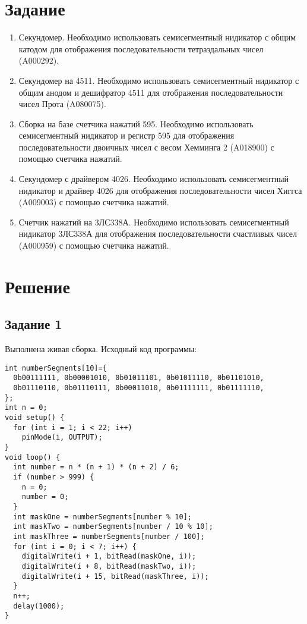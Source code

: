 \documentclass[a4paper,14pt]{extarticle}
\begin{document}
  \section*{\hspace{12.5mm}Задание}
  \begin{enumerate}
    \item Секундомер. Необходимо использовать семисегментный нидикатор с общим катодом для отображения последовательности тетраэдальных чисел (A000292).
    \item Секундомер на 4511. Необходимо использовать семисегментный нидикатор с общим анодом и дешифратор 4511 для отображения последовательности чисел Прота (A080075).
    \item Сборка на базе счетчика нажатий 595. Необходимо использовать семисегментный нидикатор и регистр 595 для отображения последовательности двоичных чисел с весом Хемминга 2 (A018900) с помощью счетчика нажатий.
    \item Секундомер с драйвером 4026. Необходимо использовать семисегментный нидикатор и драйвер 4026 для отображения последовательности чисел Хиггса (A009003) с помощью счетчика нажатий.
    \item Счетчик нажатий на 3ЛС338А. Необходимо использовать семисегментный нидикатор 3ЛС338А для отображения последовательности счастливых чисел (A000959) с помощью счетчика нажатий.
  \end{enumerate}

  \newpage
  \section*{\hspace{12.5mm}Решение}
  \subsection*{\hspace{12.5mm}Задание 1}
  Выполнена живая сборка. Исходный код программы:

  \begingroup
    \fontsize{14pt}{10pt}\selectfont
    \linespread{1}
    \begin{verbatim}
int numberSegments[10]={
  0b00111111, 0b00001010, 0b01011101, 0b01011110, 0b01101010,
  0b01110110, 0b01110111, 0b00011010, 0b01111111, 0b01111110,
};
int n = 0;
void setup() {
  for (int i = 1; i < 22; i++)
    pinMode(i, OUTPUT);
}
void loop() {
  int number = n * (n + 1) * (n + 2) / 6;
  if (number > 999) {
    n = 0;
    number = 0;
  }
  int maskOne = numberSegments[number % 10];
  int maskTwo = numberSegments[number / 10 % 10];
  int maskThree = numberSegments[number / 100];
  for (int i = 0; i < 7; i++) {
    digitalWrite(i + 1, bitRead(maskOne, i));
    digitalWrite(i + 8, bitRead(maskTwo, i));
    digitalWrite(i + 15, bitRead(maskThree, i));
  }
  n++;
  delay(1000);
}
    \end{verbatim}
  \endgroup
\end{document}
